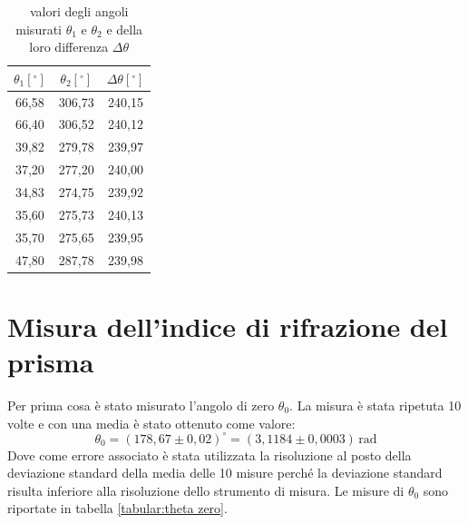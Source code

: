\documentclass{article}
\begin{document}
        \begin{table}[H]

            \centering
            \begin{tabular}{c c c}

                \toprule 
                $\theta_1 [^\circ]$ & $\theta_2 [^\circ]$  & $\Delta\theta [^\circ]$  \\
                
                \midrule
                66,58	&	306,73	&	240,15\\
                66,40	&	306,52	&	240,12\\
                39,82	&	279,78	&	239,97\\
                37,20	&	277,20	&	240,00\\
                34,83	&	274,75	&	239,92\\				
                35,60	&	275,73	&	240,13\\				
                35,70	&	275,65	&	239,95\\
                47,80	&	287,78	&	239,98\\
                \bottomrule

            \end{tabular}

            \caption{valori degli angoli misurati $\theta_1$ e $\theta_2$ e della loro differenza $\Delta\theta$}
            \label{tabular:delta theta}

        \end{table}


    \section{Misura dell'indice di rifrazione del prisma}

        Per prima cosa è stato misurato l'angolo di zero $\theta_0$. La misura è stata ripetuta 10 volte e con una media è stato ottenuto come valore:
        \[ \theta_0 = (178,67\pm 0,02) ^\circ = (3,1184 \pm 0,0003)\, \mathrm{rad} \]
        Dove come errore associato è stata utilizzata la risoluzione al posto della  deviazione standard della media delle 10 misure 
        perché la deviazione standard risulta inferiore alla risoluzione dello strumento di misura. 
        Le misure di $\theta_0$ sono riportate in tabella \ref{tabular:theta zero}.
            
\end{document}
